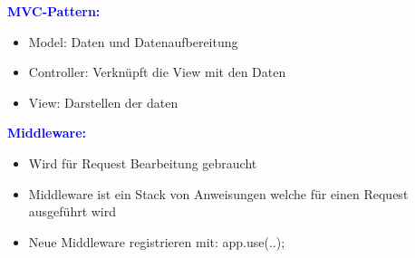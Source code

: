 \textbf{\textcolor{blue}{MVC-Pattern:}}
\begin{itemize}[topsep=0pt, leftmargin=3mm]
    \setlength\itemsep{-0.3em}
    \item Model: Daten und Datenaufbereitung
    \item Controller: Verknüpft die View mit den Daten
    \item View: Darstellen der daten
\end{itemize}
\textbf{\textcolor{blue}{Middleware:}}
\begin{itemize}[topsep=0pt, leftmargin=3mm]
    \setlength\itemsep{-0.3em}
    \item Wird für Request Bearbeitung gebraucht
    \item Middleware ist ein Stack von Anweisungen welche für einen Request ausgeführt wird
    \item Neue Middleware registrieren mit: app.use(..);
\end{itemize}

